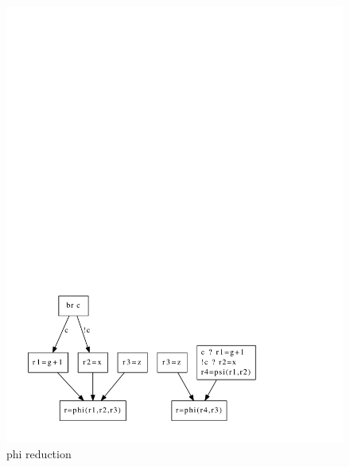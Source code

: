 \begin{figure}
\begin{minipage}[t]{5cm}
\includegraphics[scale=0.4]{phi_reduction.pdf}
\caption{phi reduction}
\label{fig:phi_red}
\end{minipage}
\begin{minipage}[t]{5cm}

\end{minipage}
\end{figure}
